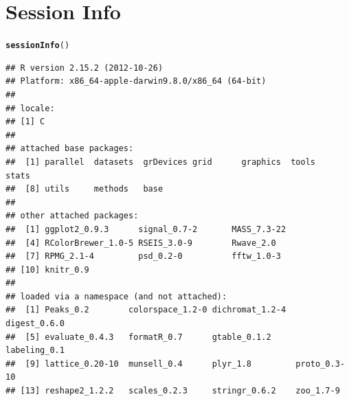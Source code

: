 \documentclass{article}\usepackage{graphicx, color}
\makeatletter
\newcommand{\hlfunctioncall}[1]{\textcolor[rgb]{0.501960784313725,0,0.329411764705882}{\textbf{#1}}}%
\newenvironment{kframe}{%
 \def\at@end@of@kframe{}%
 \ifinner\ifhmode%
  \def\at@end@of@kframe{\end{minipage}}%
  \begin{minipage}{\columnwidth}%
 \fi\fi%
 \def\FrameCommand##1{\hskip\@totalleftmargin \hskip-\fboxsep
 \colorbox{shadecolor}{##1}\hskip-\fboxsep
     \hskip-\linewidth \hskip-\@totalleftmargin \hskip\columnwidth}%
 \MakeFramed {\advance\hsize-\width
   \@totalleftmargin\z@ \linewidth\hsize
   \@setminipage}}%
 {\par\unskip\endMakeFramed%
 \at@end@of@kframe}
\newenvironment{knitrout}{}{} %
\makeatother
\begin{document}
\pagebreak
\section*{Session Info}
\begin{knitrout}
\color{fgcolor}\begin{kframe}
\begin{alltt}
\hlfunctioncall{sessionInfo}()
\end{alltt}
\begin{verbatim}
## R version 2.15.2 (2012-10-26)
## Platform: x86_64-apple-darwin9.8.0/x86_64 (64-bit)
## 
## locale:
## [1] C
## 
## attached base packages:
##  [1] parallel  datasets  grDevices grid      graphics  tools     stats    
##  [8] utils     methods   base     
## 
## other attached packages:
##  [1] ggplot2_0.9.3      signal_0.7-2       MASS_7.3-22       
##  [4] RColorBrewer_1.0-5 RSEIS_3.0-9        Rwave_2.0         
##  [7] RPMG_2.1-4         psd_0.2-0          fftw_1.0-3        
## [10] knitr_0.9         
## 
## loaded via a namespace (and not attached):
##  [1] Peaks_0.2        colorspace_1.2-0 dichromat_1.2-4  digest_0.6.0    
##  [5] evaluate_0.4.3   formatR_0.7      gtable_0.1.2     labeling_0.1    
##  [9] lattice_0.20-10  munsell_0.4      plyr_1.8         proto_0.3-10    
## [13] reshape2_1.2.2   scales_0.2.3     stringr_0.6.2    zoo_1.7-9
\end{verbatim}
\end{kframe}
\end{knitrout}



\end{document}
